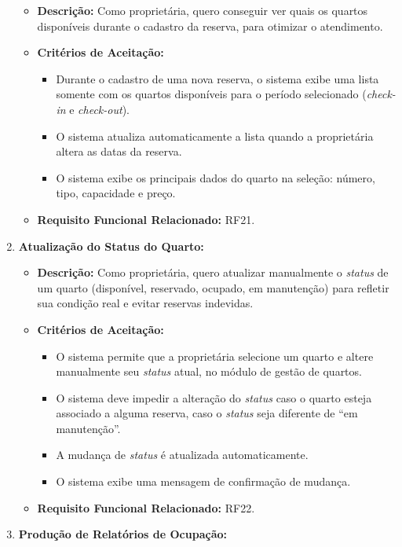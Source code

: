 \documentclass[
	12pt,				%
	openany,			%
	oneside,			%
	a4paper,			%
	english,			%
	french,				%
	spanish,			%
	brazil				%
	]{abntex2}
\begin{document}
\begin{enumerate}[label=\textbf{\arabic*.}]
	\begin{itemize}
		\item \textbf{Descrição:} Como proprietária, quero conseguir ver quais os quartos disponíveis durante o cadastro da reserva, para otimizar o atendimento.
		\item \textbf{Critérios de Aceitação:}
		\begin{itemize}
			\item Durante o cadastro de uma nova reserva, o sistema exibe uma lista somente com os quartos disponíveis para o período selecionado (\textit{check-in} e \textit{check-out}).
			\item O sistema atualiza automaticamente a lista quando a proprietária altera as datas da reserva.
			\item O sistema exibe os principais dados do quarto na seleção: número, tipo, capacidade e preço.
		\end{itemize}
		\item \textbf{Requisito Funcional Relacionado:} RF21.
	\end{itemize} 
	\item \textbf{Atualização do Status do Quarto:}
	\begin{itemize}
		\item \textbf{Descrição:} Como proprietária, quero atualizar manualmente o  \textit{status} de um quarto (disponível, reservado, ocupado, em manutenção) para refletir sua condição real e evitar reservas indevidas.
		\item \textbf{Critérios de Aceitação:}
		\begin{itemize}
			\item O sistema permite que a proprietária selecione um quarto e altere manualmente seu  \textit{status} atual, no módulo de gestão de quartos.
			\item O sistema deve impedir a alteração do  \textit{status} caso o quarto esteja associado a alguma reserva, caso o  \textit{status} seja diferente de “em manutenção”.
			\item A mudança de \textit{status} é atualizada automaticamente.
			\item O sistema exibe uma mensagem de confirmação de mudança.
		\end{itemize}
		\item \textbf{Requisito Funcional Relacionado:} RF22.
	\end{itemize} 
	\item \textbf{Produção de Relatórios de Ocupação:}
	\begin{itemize}

\end{itemize}
\end{enumerate}
\end{document}
